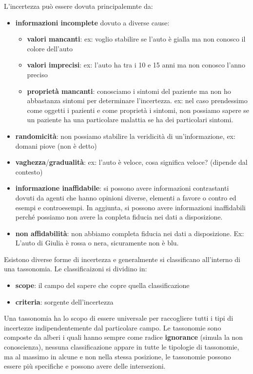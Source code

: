 L'incertezza può essere dovuta principalemnte da:
\begin{itemize}
    \item \textbf{informazioni incomplete} dovuto a diverse cause:
    \begin{itemize}
        \item \textbf{valori mancanti}: ex: voglio stabilire se l'auto è gialla ma
        non conosco il colore dell'auto
        \item \textbf{valori imprecisi}: ex: l'auto ha tra i 10 e 15 anni ma non 
        conosco l'anno preciso
        \item \textbf{proprietà mancanti}: conosciamo i sintomi del paziente ma non 
        ho abbastanza sintomi per determinare l'incertezza. ex: nel caso prendessimo come oggetti i
        pazienti e come proprietà i sintomi, non possiamo sapere se un paziente 
        ha una particolare malattia se ha dei particolari sintomi.
    \end{itemize}
    \item \textbf{randomicità}: non possiamo stabilire la 
    veridicità di un'informazione, ex: domani piove (non è detto)
    \item  \textbf{vaghezza}/\textbf{gradualità}: ex: l'auto è veloce, cosa significa veloce?
    (dipende dal contesto)
    \item \textbf{informazione inaffidabile}: si possono avere informazioni
    contrastanti dovuti da agenti che hanno opinioni diverse, elementi a favore
    o contro ed esempi e controesempi. In aggiunta, si possono avere informazioni
    inaffidabili perché possiamo non avere la conpleta fiducia nei dati a disposizione.
    \item \textbf{non affidabilità}: non abbiamo completa fiducia nei dati a disposizione.
    Ex: L'auto di Giulia è rossa o nera, sicuramente non è blu.
\end{itemize}

Esistono diverse forme di incertezza e generalmente si classificano all'interno
di una tassonomia. Le classificaizoni si dividino in:
\begin{itemize}
    \item \textbf{scope}: il campo del sapere che copre quella classificazione
    \item \textbf{criteria}: sorgente dell'incertezza
\end{itemize}

Una tassonomia ha lo scopo di essere universale per raccogliere tutti i tipi di
incertezze indipendentemente dal particolare campo. Le tassonomie sono composte
da alberi i quali hanno sempre come radice \textbf{ignorance} (simula la non conoscienza),
nessuna classificazione appare in tutte le tipologie di tassonomie, ma al massimo in alcune e non 
nella stessa posizione, le tassonomie possono essere più specifiche e possono avere delle intersezioni.

